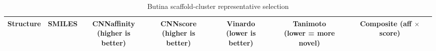 \documentclass[a4paper,12pt]{article}
\begin{document}
 \begin{table}[ht]
\centering
\caption{Butina scaffold-cluster representative selection}
\label{tab:butina_representatives}
\renewcommand{\arraystretch}{1.3}
\begin{adjustbox}{width=\textwidth}
\begin{tabular}{|
>{\centering\arraybackslash}m{2.6cm}|
>{\raggedright\arraybackslash}p{6.2cm}|
c|c|c|c|c|}
\hline
\textbf{Structure} &
\textbf{SMILES} &
\shortstack{\textbf{CNNaffinity}\\(higher is better)} &
\shortstack{\textbf{CNNscore}\\(higher is better)} &
\shortstack{\textbf{Vinardo}\\(lower is better)} &
\shortstack{\textbf{Tanimoto}\\(lower = more novel)} &
\shortstack{\textbf{Composite}\\(aff $\times$ score)} \\
\hline


\end{tabular}
\end{adjustbox}
\end{table}
\end{document}
